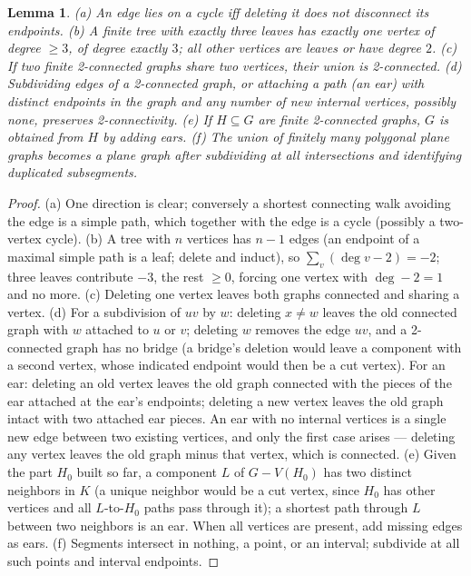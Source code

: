 \documentclass[11pt,a4paper]{article}
\theoremstyle{jsplain}
\newtheorem{lemma}[theorem]{Lemma}
\theoremstyle{jsdefn}
\begin{document}
\begin{lemma}\label{lem:graphfacts}
\textup{(a)} An edge lies on a cycle iff deleting it does not
disconnect its endpoints.
\textup{(b)} A finite tree with exactly three leaves has exactly one
vertex of degree $\ge3$, of degree exactly $3$; all other vertices are
leaves or have degree $2$.
\textup{(c)} If two finite 2-connected graphs share two vertices,
their union is 2-connected.
\textup{(d)} Subdividing edges of a 2-connected graph, or attaching a
path (an \emph{ear}) with distinct endpoints in the graph and any
number of new internal vertices, possibly none, preserves
2-connectivity.
\textup{(e)} If $H\subseteq G$ are finite 2-connected graphs, $G$ is
obtained from $H$ by adding ears.
\textup{(f)} The union of finitely many polygonal plane graphs becomes
a plane graph after subdividing at all intersections and identifying
duplicated subsegments.
\end{lemma}
\begin{proof}
(a) One direction is clear; conversely a shortest connecting walk
avoiding the edge is a simple path, which together with the edge is a
cycle (possibly a two-vertex cycle).
(b) A tree with $n$ vertices has $n-1$ edges (an endpoint of a maximal
simple path is a leaf; delete and induct), so
$\sum_v(\deg v-2)=-2$; three leaves contribute $-3$, the rest
$\ge0$, forcing one vertex with $\deg-2=1$ and no more.
(c) Deleting one vertex leaves both graphs connected and sharing a
vertex.
(d) For a subdivision of $uv$ by $w$: deleting $x\ne w$ leaves the old
connected graph with $w$ attached to $u$ or $v$; deleting $w$ removes
the edge $uv$, and a 2-connected graph has no bridge (a bridge's
deletion would leave a component with a second vertex, whose indicated
endpoint would then be a cut vertex). For an ear: deleting an old
vertex leaves the old graph connected with the pieces of the ear
attached at the ear's endpoints; deleting a new vertex leaves the old
graph intact with two attached ear pieces. An ear with no internal
vertices is a single new edge between two existing vertices, and only
the first case arises --- deleting any vertex leaves the old graph
minus that vertex, which is connected.
(e) Given the part $H_0$ built so far, a component $L$ of $G-V(H_0)$ has
two distinct neighbors in $K$ (a unique neighbor would be a cut
vertex, since $H_0$ has other vertices and all $L$-to-$H_0$ paths pass
through it); a shortest path through $L$ between two neighbors is an
ear. When all vertices are present, add missing edges as ears.
(f) Segments intersect in nothing, a point, or an interval; subdivide
at all such points and interval endpoints.
\end{proof}
\end{document}
